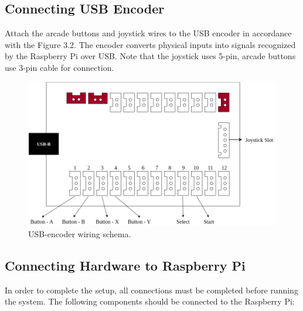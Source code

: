 \subsection{Connecting USB Encoder}
\label{subsec:connecting_usb_encoder}
Attach the arcade buttons and joystick wires to the USB encoder in accordance with the Figure 3.2. The encoder converts physical inputs into signals recognized by the Raspberry Pi over USB.
Note that the joystick uses 5-pin, arcade buttons use 3-pin cable for connection.
\\
\begin{figure}[htb]
  \centering
  \includegraphics[scale=0.36]{F_Figures/usb_encoder_layout.png}
  \caption{USB-encoder wiring schema.}
  \label{fig:usb_encoder_layout}
\end{figure}

\subsection{Connecting Hardware to Raspberry Pi}
\label{subsec:wiring_raspberry_pi}
In order to complete the setup, all connections must be completed before running the system. The following components should be connected to the Raspberry Pi:

